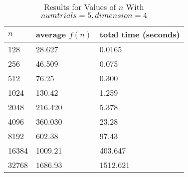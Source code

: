 \documentclass[11pt]{article}
\begin{document}
	\begin{table}[h]
		\centering
		\caption{Results for Values of $n$ With $numtrials = 5, dimension = 4$}
		\begin{tabular}{lll}
			$n$                         & average $f(n)$                        & total time (seconds)                        \\ \hline
			\multicolumn{1}{|l|}{128} & \multicolumn{1}{l|}{28.627} & \multicolumn{1}{l|}{0.0165} \\ \hline
			\multicolumn{1}{|l|}{256}    & \multicolumn{1}{l|}{46.509}       & \multicolumn{1}{l|}{0.075}       \\ \hline
			\multicolumn{1}{|l|}{512}    & \multicolumn{1}{l|}{76.25}       & \multicolumn{1}{l|}{0.300}       \\ \hline
			\multicolumn{1}{|l|}{1024}    & \multicolumn{1}{l|}{130.42}       & \multicolumn{1}{l|}{1.259}       \\ \hline
			\multicolumn{1}{|l|}{2048}    & \multicolumn{1}{l|}{216.420}       & \multicolumn{1}{l|}{5.378}       \\ \hline
			\multicolumn{1}{|l|}{4096}    & \multicolumn{1}{l|}{360.030}       & \multicolumn{1}{l|}{23.28}       \\ \hline
			\multicolumn{1}{|l|}{8192}    & \multicolumn{1}{l|}{602.38}       & \multicolumn{1}{l|}{97.43}       \\ \hline
			\multicolumn{1}{|l|}{16384}    & \multicolumn{1}{l|}{1009.21}       & \multicolumn{1}{l|}{403.647}       \\ \hline
			\multicolumn{1}{|l|}{32768}    & \multicolumn{1}{l|}{1686.93}       & \multicolumn{1}{l|}{1512.621}       \\ \hline
		\end{tabular}
	\end{table}
	
\end{document}
